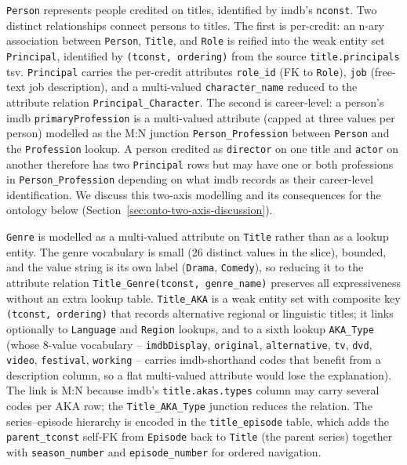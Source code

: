 \texttt{Person} represents people credited on titles, identified by \ac{imdb}'s \texttt{nconst}. Two distinct relationships connect persons to titles. The first is per-credit: an n-ary association between \texttt{Person}, \texttt{Title}, and \texttt{Role} is reified into the weak entity set \texttt{Principal}, identified by \texttt{(tconst, ordering)} from the source \texttt{title.principals} \ac{tsv}. \texttt{Principal} carries the per-credit attributes \texttt{role\_id} (FK to \texttt{Role}), \texttt{job} (free-text job description), and a multi-valued \texttt{character\_name} reduced to the attribute relation \texttt{Principal\_Character}. The second is career-level: a person's \ac{imdb} \texttt{primaryProfession} is a multi-valued attribute (capped at three values per person) modelled as the M:N junction \texttt{Person\_Profession} between \texttt{Person} and the \texttt{Profession} lookup. A person credited as \texttt{director} on one title and \texttt{actor} on another therefore has two \texttt{Principal} rows but may have one or both professions in \texttt{Person\_Profession} depending on what \ac{imdb} records as their career-level identification. We discuss this two-axis modelling and its consequences for the ontology below (Section~\ref{sec:onto-two-axis-discussion}).

\texttt{Genre} is modelled as a multi-valued attribute on \texttt{Title} rather than as a lookup entity. The genre vocabulary is small (26 distinct values in the slice), bounded, and the value string is its own label (\texttt{Drama}, \texttt{Comedy}), so reducing it to the attribute relation \texttt{Title\_Genre(tconst, genre\_name)} preserves all expressiveness without an extra lookup table. \texttt{Title\_AKA} is a weak entity set with composite key \texttt{(tconst, ordering)} that records alternative regional or linguistic titles; it links optionally to \texttt{Language} and \texttt{Region} lookups, and to a sixth lookup \texttt{AKA\_Type} (whose 8-value vocabulary -- \texttt{imdbDisplay}, \texttt{original}, \texttt{alternative}, \texttt{tv}, \texttt{dvd}, \texttt{video}, \texttt{festival}, \texttt{working} -- carries \ac{imdb}-shorthand codes that benefit from a description column, so a flat multi-valued attribute would lose the explanation). The link is M:N because \ac{imdb}'s \texttt{title.akas.types} column may carry several codes per AKA row; the \texttt{Title\_AKA\_Type} junction reduces the relation. The series--episode hierarchy is encoded in the \texttt{title\_episode} table, which adds the \texttt{parent\_tconst} self-FK from \texttt{Episode} back to \texttt{Title} (the parent series) together with \texttt{season\_number} and \texttt{episode\_number} for ordered navigation.


